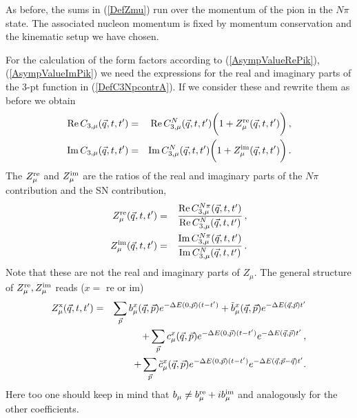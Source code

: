 \documentclass[11pt,prd,aps,showpacs,eqsecnum,floatfix,nofootinbib,preprint,tightenlines]{revtex4}
\newcommand{\nn}{\nonumber}
\newcommand{\pref}[1]{(\ref{#1})}
\begin{document}
As before, the sums in \pref{DefZmu} run over the momentum of the pion in the $N\pi$ state. The associated nucleon momentum is fixed by momentum conservation and the kinematic setup we have chosen.

For the calculation of the form factors according to \pref{AsympValueRePik}, \pref{AsympValueImPik} we need the expressions for the real and imaginary parts of the 3-pt function in \pref{DefC3NpcontrA}. If we consider these and rewrite them as before we obtain
\begin{eqnarray}
{\rm Re}\,C_{3,\mu}(\vec{q},t,t') & = & {\rm Re}\,C^N_{3,\mu}(\vec{q},t,t')\bigg(1+ Z^{\rm re}_{\mu}(\vec{q},t,t')\bigg) \,,\label{DefZre}\\
{\rm Im}\,C_{3,\mu}(\vec{q},t,t') & = & {\rm Im}\,C^N_{3,\mu}(\vec{q},t,t')\bigg(1+ Z^{\rm im}_{\mu}(\vec{q},t,t')\bigg) \,.\label{DefZim}
\end{eqnarray}
The $Z^{\rm re}_{\mu}$ and $Z^{\rm im}_{\mu}$ are the ratios of the real and imaginary parts of the $N\pi$ contribution and the SN contribution,
\begin{eqnarray}
Z^{\rm re}_{\mu}(\vec{q},t,t') &=& \frac{{\rm Re}\,C^{N\pi}_{3,\mu}(\vec{q},t,t')}{{\rm Re}\,C^N_{3,\mu}(\vec{q},t,t')}\,,\\
Z^{\rm im}_{\mu}(\vec{q},t,t') &=& \frac{{\rm Im}\,C^{N\pi}_{3,\mu}(\vec{q},t,t')}{{\rm Im}\,C^N_{3,\mu}(\vec{q},t,t')}\,.
\end{eqnarray}
Note that these are not the real and imaginary parts of $Z_{\mu}$. The general structure of $Z^{\rm re}_{\mu}, Z^{\rm im}_{\mu}$  reads ($x=$ re or im)
\begin{eqnarray}
Z^{\rm x}_{\mu}(\vec{q},t,t') & = &   \sum_{\vec{p}} b^x_{\mu}(\vec{q},\vec{p}) e^{-\Delta E(0,\vec{p}) (t-t')}+\tilde{b}^x_{\mu}(\vec{q},\vec{p}) e^{-\Delta E(\vec{q},\vec{p}) t'} \nn\\
& & +  \sum_{\vec{p}} c^x_{\mu}(\vec{q},\vec{p}) e^{-\Delta E(0,\vec{p}) (t-t')}e^{-\Delta E(\vec{q},\vec{p}) t'}\,,\nn\\
& & +  \sum_{\vec{p}} \tilde{c}^x_{\mu}(\vec{q},\vec{p}) e^{-\Delta E(0,\vec{p}) (t-t')}e^{-\Delta E(\vec{q},\vec{p}-\vec{q}) t'}.\label{DefC3Npcontr}
\end{eqnarray}
Here too one should keep in mind that $b_{\mu}\neq b^{\rm re}_{\mu}+ib^{\rm im}_{\mu}$ and analogously for the other coefficients.
\end{document}
